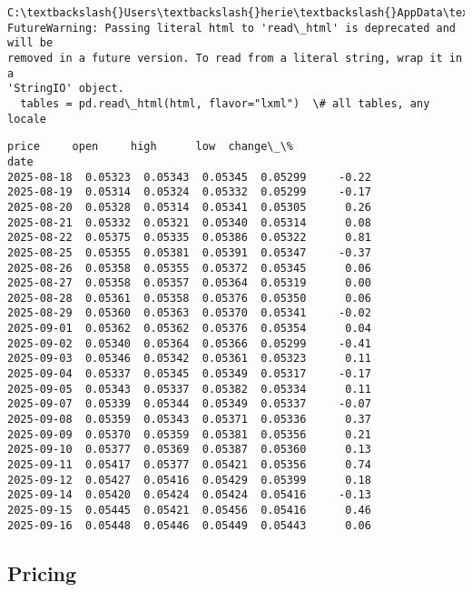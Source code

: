\documentclass[11pt,a4paper]{article}
\makeatletter
\newcommand{\boxspacing}{\kern\kvtcb@left@rule\kern\kvtcb@boxsep}
\newcommand{\prompt}[4]{
        {\ttfamily\llap{{\color{#2}[#3]:\hspace{3pt}#4}}\vspace{-\baselineskip}}
    }
\makeatother
\begin{document}
    \begin{Verbatim}[commandchars=\\\{\}]
C:\textbackslash{}Users\textbackslash{}herie\textbackslash{}AppData\textbackslash{}Local\textbackslash{}Temp\textbackslash{}ipykernel\_21496\textbackslash{}338722890.py:11:
FutureWarning: Passing literal html to 'read\_html' is deprecated and will be
removed in a future version. To read from a literal string, wrap it in a
'StringIO' object.
  tables = pd.read\_html(html, flavor="lxml")  \# all tables, any locale
    \end{Verbatim}

            \begin{tcolorbox}[breakable, size=fbox, boxrule=.5pt, pad at break*=1mm, opacityfill=0]
\prompt{Out}{outcolor}{25}{\boxspacing}
\begin{Verbatim}[commandchars=\\\{\}]
              price     open     high      low  change\_\%
date
2025-08-18  0.05323  0.05343  0.05345  0.05299     -0.22
2025-08-19  0.05314  0.05324  0.05332  0.05299     -0.17
2025-08-20  0.05328  0.05314  0.05341  0.05305      0.26
2025-08-21  0.05332  0.05321  0.05340  0.05314      0.08
2025-08-22  0.05375  0.05335  0.05386  0.05322      0.81
2025-08-25  0.05355  0.05381  0.05391  0.05347     -0.37
2025-08-26  0.05358  0.05355  0.05372  0.05345      0.06
2025-08-27  0.05358  0.05357  0.05364  0.05319      0.00
2025-08-28  0.05361  0.05358  0.05376  0.05350      0.06
2025-08-29  0.05360  0.05363  0.05370  0.05341     -0.02
2025-09-01  0.05362  0.05362  0.05376  0.05354      0.04
2025-09-02  0.05340  0.05364  0.05366  0.05299     -0.41
2025-09-03  0.05346  0.05342  0.05361  0.05323      0.11
2025-09-04  0.05337  0.05345  0.05349  0.05317     -0.17
2025-09-05  0.05343  0.05337  0.05382  0.05334      0.11
2025-09-07  0.05339  0.05344  0.05349  0.05337     -0.07
2025-09-08  0.05359  0.05343  0.05371  0.05336      0.37
2025-09-09  0.05370  0.05359  0.05381  0.05356      0.21
2025-09-10  0.05377  0.05369  0.05387  0.05360      0.13
2025-09-11  0.05417  0.05377  0.05421  0.05356      0.74
2025-09-12  0.05427  0.05416  0.05429  0.05399      0.18
2025-09-14  0.05420  0.05424  0.05424  0.05416     -0.13
2025-09-15  0.05445  0.05421  0.05456  0.05416      0.46
2025-09-16  0.05448  0.05446  0.05449  0.05443      0.06
\end{Verbatim}
\end{tcolorbox}
        
    \hypertarget{pricing}{%
\subsection{Pricing}\label{pricing}}
\end{document}
